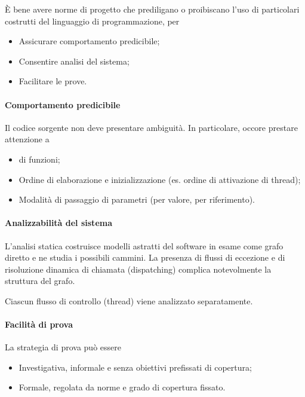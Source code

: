 \`E bene avere norme di progetto che prediligano o proibiscano l'uso di
particolari costrutti del linguaggio di programmazione, per

\begin{itemize}
  \item Assicurare comportamento predicibile;
  \item Consentire analisi del sistema;
  \item Facilitare le prove.
\end{itemize}

\paragraph{Comportamento predicibile}
\label{ssub:comportamento_predicibile}

Il codice sorgente non deve presentare ambiguità. In particolare, occore
prestare attenzione a

\begin{itemize}
  \item {} di funzioni;
  \item Ordine di elaborazione e inizializzazione (es. ordine di attivazione di
    thread);
  \item Modalità di passaggio di parametri (per valore, per riferimento).
\end{itemize}

\paragraph{Analizzabilità del sistema}
\label{ssub:analizzabilit_del_sistema}

L'analisi statica costruisce modelli astratti del software in esame come grafo
diretto e ne studia i possibili cammini. La presenza di flussi di eccezione e di
risoluzione dinamica di chiamata (dispatching) complica notevolmente la
struttura del grafo.

Ciascun flusso di controllo (thread) viene analizzato separatamente.

\paragraph{Facilità di prova}
\label{ssub:facilit_di_prova}

La strategia di prova può essere

\begin{itemize}
  \item Investigativa, informale e senza obiettivi prefissati di copertura;
  \item Formale, regolata da norme e grado di copertura fissato.
\end{itemize}

